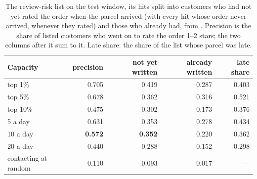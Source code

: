 \begin{table}[htbp]
\centering
\caption{The review-risk list on the test window, its hits split into customers
who had not yet rated the order when the parcel arrived (with every hit whose
order never arrived, whenever they rated) and those who already had, from
. Precision is the share of
listed customers who went on to rate the order 1--2 stars; the two columns after
it sum to it. Late share: the share of the list whose parcel was late.}
\label{tab:timing-capacity}
\small
\begin{tabular}{@{}lrrrr@{}}
\toprule
\textbf{Capacity} & \textbf{precision} & \textbf{not yet written} & \textbf{already written} & \textbf{late share} \\
\midrule
top 1\%  & 0.705 & 0.419 & 0.287 & 0.403 \\
top 5\%  & 0.678 & 0.362 & 0.316 & 0.521 \\
top 10\% & 0.475 & 0.302 & 0.173 & 0.376 \\
5 a day  & 0.631 & 0.353 & 0.278 & 0.434 \\
10 a day & \textbf{0.572} & \textbf{0.352} & 0.220 & 0.362 \\
20 a day & 0.440 & 0.288 & 0.152 & 0.298 \\
\midrule
contacting at random & 0.110 & 0.093 & 0.017 & --- \\
\bottomrule
\end{tabular}
\end{table}

